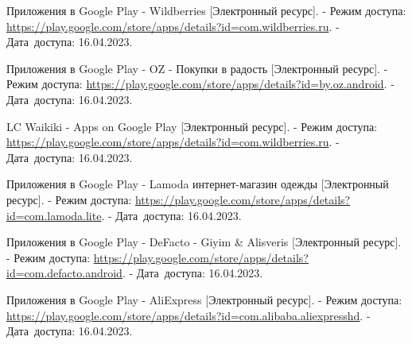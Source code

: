\begingroup

  \renewcommand{\addcontentsline}[3]{}%
  \renewcommand{\section}[2]{}%

  \begin{thebibliography}{}

    Приложения в Google Play - Wildberries
    [Электронный ресурс].
    - Режим доступа: \url{https://play.google.com/store/apps/details?id=com.wildberries.ru}.
    - Дата~доступа: 16.04.2023.

    Приложения в Google Play - OZ - Покупки в радость
    [Электронный ресурс].
    - Режим доступа: \url{https://play.google.com/store/apps/details?id=by.oz.android}.
    - Дата~доступа: 16.04.2023.

    LC Waikiki - Apps on Google Play
    [Электронный ресурс].
    - Режим доступа: \url{https://play.google.com/store/apps/details?id=com.wildberries.ru}.
    - Дата~доступа: 16.04.2023.

    Приложения в Google Play - Lamoda интернет-магазин одежды
    [Электронный ресурс].
    - Режим доступа: \url{https://play.google.com/store/apps/details?id=com.lamoda.lite}.
    - Дата~доступа: 16.04.2023.

    Приложения в Google Play - DeFacto - Giyim \& Alisveris %
    [Электронный ресурс].
    - Режим доступа: \url{https://play.google.com/store/apps/details?id=com.defacto.android}.
    - Дата~доступа: 16.04.2023.

    Приложения в Google Play - AliExpress
    [Электронный ресурс].
    - Режим доступа: \url{https://play.google.com/store/apps/details?id=com.alibaba.aliexpresshd}.
    - Дата~доступа: 16.04.2023.


\end{thebibliography}
